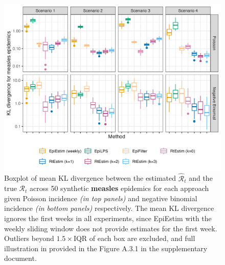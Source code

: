 \documentclass[10pt,letterpaper]{article}
\def\calR{\mathcal{R}}
\renewcommand{\hat}{\widehat}
\begin{document}
\begin{figure}[!ht]
  \centering
  \includegraphics[width=.99\textwidth]{fig/fig_kl_week_measles.png}
  \caption{Boxplot of mean KL divergence between the estimated 
  $\hat{\calR}_t$ and the true $\calR_t$ across 50 synthetic \textbf{measles} epidemics for 
  each approach given Poisson incidence \textit{(in top panels)} and negative 
  binomial incidence \textit{(in bottom panels)} respectively. 
  The mean KL divergence ignores the first weeks in all experiments, since EpiEstim 
  with the weekly sliding window does not provide estimates for the first week.
  Outliers beyond $1.5\times$IQR of each box are excluded, and full illustration in 
  provided in the Figure A.3.1 in the supplementary document.} 
  \label{fig:kl-res-measles}
\end{figure}
\end{document}
